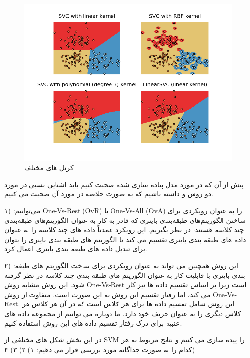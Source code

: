 \documentclass{article}
\begin{document}
\begin{figure}[h]
	\centering
	\includegraphics[width=1\linewidth]{Photo/19}
	\caption[کرنل های مختلف ]{کرنل های مختلف }
	\label{fig:16}
\end{figure}
پیش از آن که در مورد مدل پیاده سازی شده صحبت کنیم باید اشنایی نسبی در مورد دو روش  و  داشته باشیم که به صورت خلاصه در مورد آن صحبت می کنیم.\newline


۱) :می‌توانیم One-Vs-Rest (OvR) یا One-Vs-All (OvA) را به عنوان رویکردی برای ساختن الگوریتم‌های طبقه‌بندی باینری که قادر به کار به عنوان الگوریتم‌های طبقه‌بندی چند کلاسه هستند، در نظر بگیریم. این رویکرد عمدتاً داده های چند کلاسه را به عنوان داده های طبقه بندی باینری تقسیم می کند تا الگوریتم های طبقه بندی باینری را بتوان برای تبدیل داده های طبقه بندی باینری اعمال کرد.\newline


۲) :این روش همچنین می تواند به عنوان رویکردی برای ساخت الگوریتم های طبقه بندی باینری با قابلیت کار به عنوان الگوریتم های طبقه بندی چند کلاسه در نظر گرفته شود. این روش مشابه روش One-Vs-Rest است زیرا بر اساس تقسیم داده ها نیز کار می کند، اما رفتار تقسیم این روش به این صورت است. متفاوت از روش One-Vs-Rest. این روش شامل تقسیم داده ها برای هر کلاس است که در آن هر کلاس هر کلاس دیگری را به عنوان حریف خود دارد. ما دوباره می توانیم از مجموعه داده های عنبیه برای درک رفتار تقسیم داده های این روش استفاده کنیم.\newline

در این بخش شکل های مختلفی از SVM را پیده سازی می کنیم و نتایج مربوط به هر کدام را به صورت جداگانه مورد بررسی قرار می دهیم:\newline
۱)\newline
۲)\newline
۳)\newline
۴)\newline
\end{document}
